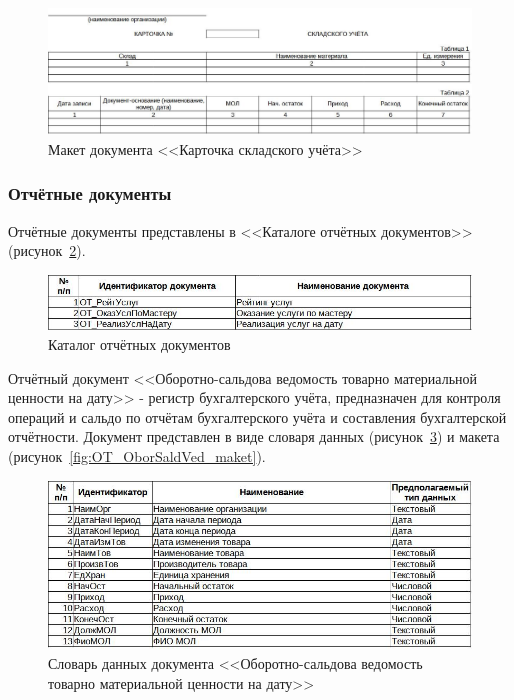 \documentclass[12pt, a4paper, simple]{eskdtext}
\begin{document}
    \begin{figure}[!h]
        \centering
        \includegraphics[width=14cm]
            {_docs/ОП_КартСклУч_макет.jpg}
        \caption{Макет документа <<Карточка складского учёта>>}
        \label{fig:OP_KartSklYch_maket}
    \end{figure}

    \subsubsection{Отчётные документы}

    Отчётные документы представлены в <<Каталоге отчётных документов>> (рисунок~\ref{fig:OT_}).
    
    \begin{figure}[!h]
        \centering
        \includegraphics[width=14cm]
            {_docs/ОТ_.jpg}
        \caption{Каталог отчётных документов}
        \label{fig:OT_}
    \end{figure}

    \newpage

    Отчётный документ <<Оборотно-сальдова ведомость товарно материальной ценности на дату>>
    - регистр бухгалтерского учёта, предназначен для контроля операций
    и сальдо по отчётам бухгалтерского учёта и составления бухгалтерской отчётности.
    Документ представлен в виде словаря данных (рисунок~\ref{fig:OT_OborSaldVed_tipi})
    и макета (рисунок~\ref{fig:OT_OborSaldVed_maket}).

    \begin{figure}[!h]
        \centering
        \includegraphics[width=14cm]
            {_docs/ОТ_ОборСальдВед_типы.jpg}
        \caption{Словарь данных документа <<Оборотно-сальдова ведомость товарно материальной ценности на дату>>}
        \label{fig:OT_OborSaldVed_tipi}
    \end{figure}
\end{document}
